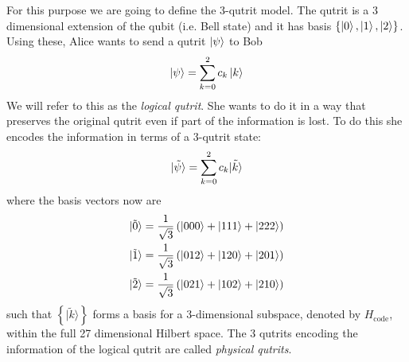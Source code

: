 \documentclass[letter,12pt]{article}
\begin{document}
For this purpose we are going to define the 3-qutrit model. The qutrit is a 3 dimensional extension of the qubit (i.e. Bell state) and it has basis $\{\ket{0},\ket{1},\ket{2}\}$. Using these, Alice wants to send a qutrit $\ket{\psi}$ to Bob
\begin{equation}
	\begin{aligned}
		\ket{\psi}=\sum_{k=0}^{2}c_k \ket{k}
	\end{aligned}
\end{equation}
We will refer to this as the \textit{logical qutrit}. She wants to do it in a way that preserves the original qutrit even if part of the information is lost. To do this she encodes the information in terms of a 3-qutrit state:
\begin{equation}
	\begin{aligned}
		|\tilde \psi\rangle=\sum_{k=0}^{2}c_k \tilde{\ket{k}}
	\end{aligned}
\end{equation}
where the basis vectors now are
	\begin{equation} \label{eq:masslessSH}
		\begin{aligned}
			|\tilde 0\rangle &=\frac{1}{\sqrt{3}}\left(\ket{000}+\ket{111}+\ket{222}\right)\\
			|\tilde 1\rangle &=\frac{1}{\sqrt{3}}\left(\ket{012}+\ket{120}+\ket{201}\right)\\
			|\tilde 2\rangle &=\frac{1}{\sqrt{3}}\left(\ket{021}+\ket{102}+\ket{210}\right)\\
		\end{aligned}
	\end{equation}
such that $\left\{|\tilde k\rangle\right\}$ forms a basis for a 3-dimensional subspace, denoted by $H_{\text{code}}$, within the full 27 dimensional Hilbert space. The 3 qutrits encoding the information of the logical qutrit are called \textit{physical qutrits}. 
\end{document}
